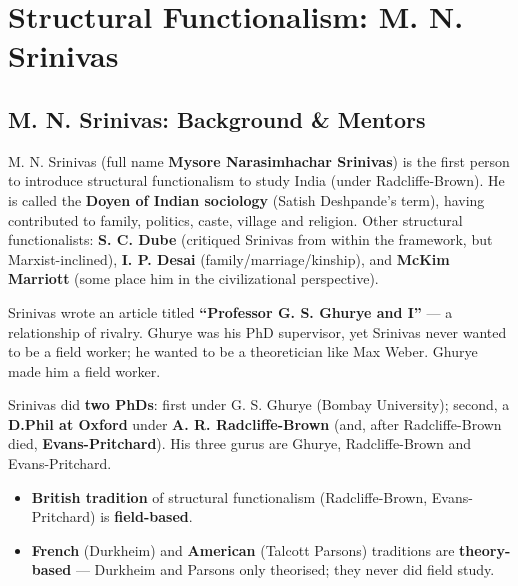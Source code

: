\chapter{Structural Functionalism: M. N. Srinivas}

\section{M. N. Srinivas: Background \& Mentors}

M. N. Srinivas (full name \textbf{Mysore Narasimhachar Srinivas}) is the first person to introduce structural functionalism to study India (under Radcliffe-Brown). He is called the \textbf{Doyen of Indian sociology} (Satish Deshpande's term), having contributed to family, politics, caste, village and religion. Other structural functionalists: \textbf{S. C. Dube} (critiqued Srinivas from within the framework, but Marxist-inclined), \textbf{I. P. Desai} (family/marriage/kinship), and \textbf{McKim Marriott} (some place him in the civilizational perspective).

\begin{KeyConcept}
Srinivas wrote an article titled \textbf{``Professor G. S. Ghurye and I''} --- a relationship of rivalry. Ghurye was his PhD supervisor, yet Srinivas never wanted to be a field worker; he wanted to be a theoretician like Max Weber. Ghurye made him a field worker.
\end{KeyConcept}

\begin{DataFact}
Srinivas did \textbf{two PhDs}: first under G. S. Ghurye (Bombay University); second, a \textbf{D.Phil at Oxford} under \textbf{A. R. Radcliffe-Brown} (and, after Radcliffe-Brown died, \textbf{Evans-Pritchard}). His three gurus are Ghurye, Radcliffe-Brown and Evans-Pritchard.
\end{DataFact}

\begin{ComparisonBox}
\begin{itemize}
\item \textbf{British tradition} of structural functionalism (Radcliffe-Brown, Evans-Pritchard) is \textbf{field-based}.
\item \textbf{French} (Durkheim) and \textbf{American} (Talcott Parsons) traditions are \textbf{theory-based} --- Durkheim and Parsons only theorised; they never did field study.
\end{itemize}
\end{ComparisonBox}

